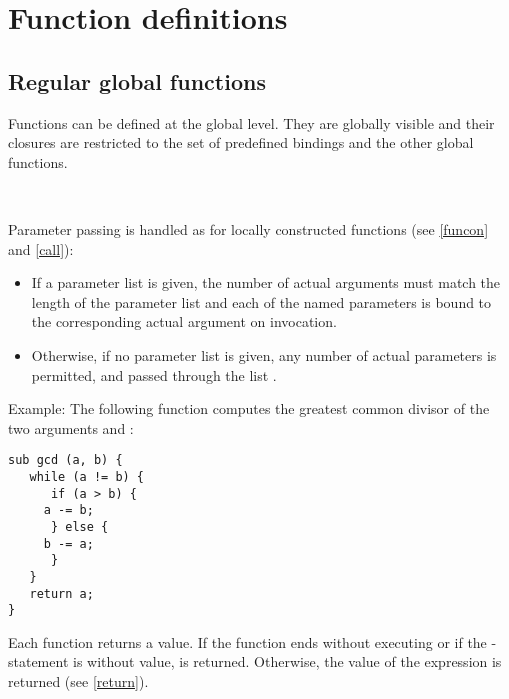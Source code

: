 \chapter{Function definitions}\label{functiondef}

\section{Regular global functions}

Functions can be defined at the global level. They are
globally visible and their closures are restricted
to the set of predefined bindings and the other global functions.

\begin{grammar}
      \produces {}   \\
      \produces {} 
	  
\end{grammar}

\noindent
Parameter passing is handled as for locally constructed functions
(see \ref{funcon} and \ref{call}):

\begin{itemize}
   \item If a parameter list is given,
      the number of actual arguments must match the length of the
      parameter list and each of the named parameters is bound to the
      corresponding actual argument on invocation.
   \item Otherwise, if no parameter list is given, any number
      of actual parameters is permitted, and passed through
      the list .
\end{itemize}

\noindent
Example: The following function computes the greatest common divisor
of the two arguments  and :

\begin{lstlisting}
sub gcd (a, b) {
   while (a != b) {
      if (a > b) {
	 a -= b;
      } else {
	 b -= a;
      }
   }
   return a;
}
\end{lstlisting}

\noindent
Each function returns a value. If the function ends without
executing  or if the -statement
is without value,  is returned. Otherwise, the
value of the  expression is returned (see \ref{return}).

